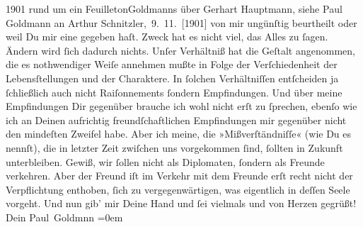 \begin{ledgroupsized}[t]{13cm}
{{{                     1901 rund um ein FeuilletonGoldmanns über Gerhart Hauptmann, siehe Paul Goldmann an Arthur Schnitzler, 9. 11. [1901]}}}\label{K_L03194-11h} von mir ungünſtig beurtheilt  oder weil Du mir eine \label{K_L03194-12v}\label{K_L03194-12h} gegeben haſt.\pend
           \pstart
           Zweck hat es nicht viel, das Alles zu ſagen. Ändern wird ſich dadurch nichts. Unſer
               Verhältniß hat die Geſtalt angenommen, {\pb}die es
               nothwendiger Weiſe annehmen mußte in Folge der Verſchiedenheit der Lebensſtellungen
               und der Charaktere. In ſolchen Verhältniſſen entſcheiden ja ſchließlich auch nicht
               Raiſonnements ſondern Empfindungen. Und über meine Empfindungen Dir gegenüber brauche
               ich wohl nicht erſt zu ſprechen, ebenſo wie ich an Deinen aufrichtig\strikeout{\textcolor{gray}{e}} freundſchaftlichen Empfindungen
                   mir gegenüber nicht den mindeſten Zweifel habe.
               Aber ich meine, die »Mißverſtändniſſe« (wie Du es nennſt), die in letzter Zeit
               zwiſchen uns vorgekommen ſind, ſollten in Zukunft unterbleiben. Gewiß, wir ſollen
               nicht als Diplomaten, ſondern als Freunde verkehren. Aber der Freund iſt im Verkehr mit dem Freunde erſt recht nicht der Verpflichtung
               enthoben, ſich zu vergegenwärtigen, was eigentlich in deſſen Seele vorgeht.\pend
           \pstart
           Und nun gib’ mir Deine Hand und ſei  vielmals
               und von Herzen gegrüßt! {\\[\baselineskip]}Dein \spacefill\mbox{Paul Goldmnn}\pend
           \leftskip=0em{}
         
         \endnumbering{}\end{ledgroupsized}  \newcommand{\dateiname}{L03194}\newcommand{\titel}{Paul Goldmann an Arthur Schnitzler, 20. 1. [1902]}\newcommand{\editorInnen}{Martin Anton Müller und Laura Untner}
      
